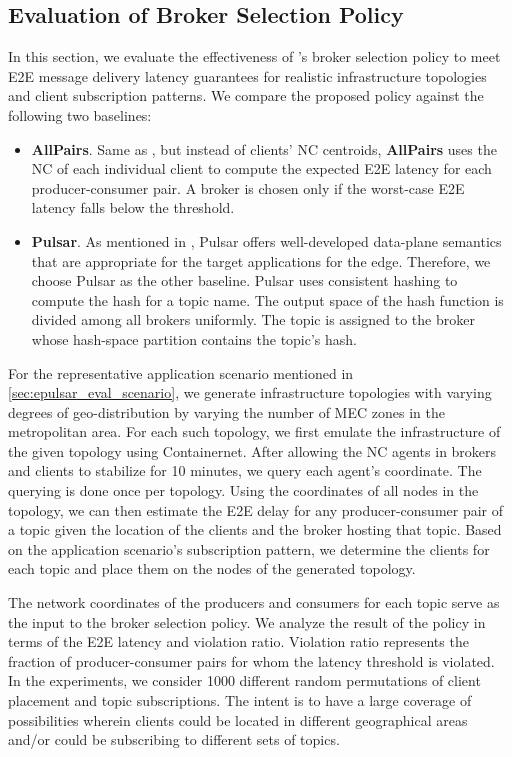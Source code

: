 \subsection{Evaluation of Broker Selection Policy}
In this section, we evaluate the effectiveness of \epulsar{}'s broker selection policy to meet E2E message delivery latency guarantees for realistic infrastructure topologies and client subscription patterns. We compare the proposed policy against the following two baselines:
\begin{itemize}
\item \textbf{AllPairs}. Same as \epulsar, but instead of clients' NC  centroids, \textbf{AllPairs} uses the NC of each individual client to compute the expected E2E latency for each producer-consumer pair. A broker is chosen only if the worst-case E2E latency falls below the threshold.
\item \textbf{Pulsar}. As mentioned in , Pulsar offers well-developed data-plane semantics that are appropriate for the target applications for the edge. Therefore, we choose Pulsar as the other baseline. Pulsar uses consistent hashing to compute the hash for a topic name. The output space of the hash function is divided among all brokers uniformly. The topic is assigned to the broker whose hash-space partition contains the topic's hash.
\end{itemize}

For the representative application scenario mentioned in \cref{sec:epulsar_eval_scenario}, we generate infrastructure topologies with varying degrees of geo-distribution by varying the number of MEC zones in the metropolitan area. For each such topology, we first emulate the infrastructure of the given topology using Containernet. After allowing the NC agents in brokers and clients to stabilize for 10 minutes, we query each agent's coordinate. The querying is done once per topology. Using the coordinates of all nodes in the topology, we can then estimate the E2E delay for any producer-consumer pair of a topic given the location of the clients and the broker hosting that topic. Based on the application scenario's subscription pattern, we determine the clients for each topic and place them on the nodes of the generated topology. 

The network coordinates of the producers and consumers for each topic serve as the input to the broker selection policy. We analyze the result of the policy in terms of the E2E latency and violation ratio. Violation ratio represents the fraction of producer-consumer pairs for whom the latency threshold is violated. In the experiments, we consider 1000 different random permutations of client placement and topic subscriptions.  The intent is to have a large coverage of possibilities wherein clients could be located in different geographical areas and/or could be subscribing to different sets of topics.

